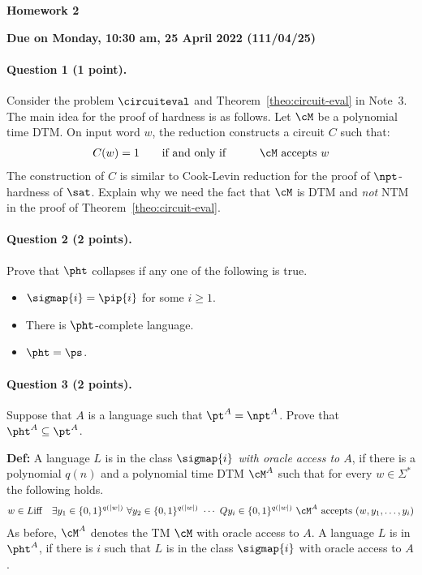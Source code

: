 \documentclass[11pt, a4paper]{article}
\renewcommand{\lessontitle}{Homework 2}
\renewcommand{\fulltitle}{\lessontitle}
\begin{document}
\date{}



\begin{center}
{\Large {\bf \fulltitle}}
\end{center}
\begin{center}
{\Large {\bf Due on Monday, 10:30 am, 25 April 2022 (111/04/25)}}
\end{center}


\vspace{0.5cm}

\paragraph*{Question 1 (1 point).}
Consider the problem $\circuiteval$ and Theorem~\ref{theo:circuit-eval} in Note~3.
The main idea for the proof of hardness is as follows.
Let $\cM$ be a polynomial time DTM.
On input word $w$, the reduction constructs a circuit $C$ such that:
\begin{eqnarray*}
C(w)=1 \qquad& \text{if and only if} &\qquad \cM\ \text{accepts}\ w
\end{eqnarray*} 
The construction of $C$ is similar to Cook-Levin reduction for the proof of $\npt$-hardness of $\sat$.
Explain why we need the fact that $\cM$ is DTM and {\em not} NTM in the proof of Theorem~\ref{theo:circuit-eval}.




\paragraph*{Question 2 (2 points).}
Prove that $\pht$ collapses if any one of the following is true.
\begin{itemize}
\item
$\sigmap {i} = \pip {i}$ for some $i\geq 1$.
\item
There is $\pht$-complete language.
\item
$\pht=\ps$.
\end{itemize}

\paragraph*{Question 3 (2 points).}
Suppose that $A$ is a language such that $\pt^A =\npt^A$.
Prove that $\pht^{A}\subseteq \pt^A$.

\vspace{0.3cm}
{\bf Def:} A language $L$ is in the class {\em $\sigmap {i}$ with oracle access to $A$},
if there is a polynomial $q(n)$ and a polynomial time DTM $\cM^A$
such that for every $w\in \Sigma^*$ the following holds.
\begin{eqnarray*}
\label{eq:sigmap}
w \in L & \text{iff} &
\exists y_1 \in \{0,1\}^{q(|w|)}\ 
\forall y_2 \in \{0,1\}^{q(|w|)}\ 
\cdots \
Q y_i \in \{0,1\}^{q(|w|)}\
\cM^A \ \text{accepts}\ (w,y_1,\ldots,y_i) 
\end{eqnarray*}
As before, $\cM^{A}$ denotes the TM $\cM$ with oracle access to $A$.
A language $L$ is in $\pht^A$, if there is $i$ such that $L$ is in the class $\sigmap {i}$ with oracle access to $A$.
\end{document}
